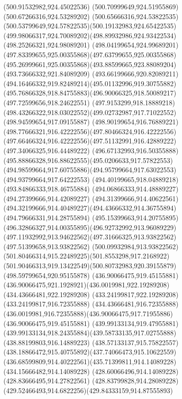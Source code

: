 {{{{				\lineto(500.91532982,924.45022536)
				\lineto(500.70999649,924.51955869)
				\lineto(500.67266316,924.53289202)
				\curveto(500.65666316,924.53822535)(500.53799649,924.57822535)(500.19132983,924.65422535)
				\curveto(499.98066317,924.70089202)(498.89932986,924.93422534)(498.25266321,924.98089201)
				\curveto(498.04199654,924.99689201)(497.83399655,925.00355868)(497.63799655,925.00355868)
				\curveto(495.26999661,925.00355868)(493.88599665,923.88089204)(493.73666332,921.84089209)
				\curveto(493.66199666,920.82089211)(494.16466332,919.82489214)(495.01132996,919.30755882)
				\curveto(495.76866328,918.84755883)(496.90066325,918.50089217)(497.72599656,918.24622551)
				\lineto(497.9153299,918.18889218)
				\curveto(498.43266322,918.03022552)(499.02732987,917.71022552)(498.94599654,917.09155887)
				\curveto(498.90199654,916.76889221)(498.77666321,916.42222556)(497.80466324,916.42222556)
				\curveto(497.66466324,916.42222556)(497.51132991,916.42889222)(497.34066325,916.44489222)
				\curveto(496.67132993,916.50355888)(495.88866328,916.88622555)(495.0206633,917.57822553)
				\curveto(494.98599664,917.60755886)(494.95799664,917.63022553)(494.93799664,917.64222553)
				\lineto(494.40199665,918.04889218)
				\lineto(493.84866333,918.46755884)
				\lineto(494.06866333,914.48889227)
				\lineto(494.27399666,914.42089227)
				\lineto(494.31399666,914.40622561)
				\curveto(494.32199666,914.40489227)(494.43666332,914.36755894)(494.79666331,914.28755894)
				\curveto(495.15399663,914.20755895)(496.32866327,914.00355895)(496.92732992,913.96089229)
				\curveto(497.11932992,913.94622562)(497.31666325,913.93822562)(497.51399658,913.93822562)
				\curveto(500.09932984,913.93822562)(501.80466314,915.22489225)(501.8553298,917.2168922)
				\curveto(501.90466313,919.13422549)(500.80732983,920.39155879)(498.59799654,920.95155878)
				\moveto(436.90066475,919.45155881)
				\curveto(436.90066475,921.1928921)(436.0019981,922.19289208)(434.43666481,922.19289208)
				\lineto(433.24199817,922.19289208)
				\lineto(433.24199817,916.72355888)
				\lineto(434.43666481,916.72355888)
				\curveto(436.0019981,916.72355888)(436.90066475,917.71955886)(436.90066475,919.45155881)
				\moveto(439.99133134,919.47955881)
				\curveto(439.99133134,918.24355884)(439.58733135,917.02755888)(438.88199803,916.14889223)
				\curveto(438.57133137,915.75822557)(438.18866472,915.40755892)(437.74066473,915.10622559)
				\curveto(436.68599809,914.40222561)(435.71399811,914.14089228)(434.15666482,914.14089228)
				\lineto(428.60066496,914.14089228)
				\lineto(428.83666495,914.27822561)
				\curveto(428.83799828,914.28089228)(429.52466493,914.6822256)(429.84333159,914.87555893)
}}}}

